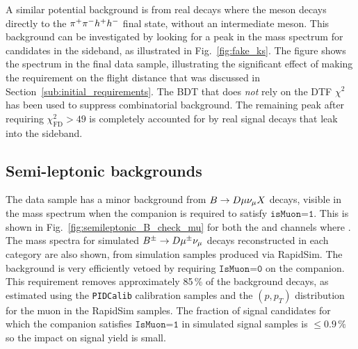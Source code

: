 A similar potential background is from real \BtoDh decays where the \D meson decays directly to the ${{\pi}^+}{{\pi}^-} h^+ h^-$ final state, without an intermediate \KS meson. This background can be investigated by looking for a peak in the \B mass spectrum for candidates in the \KS sideband, as illustrated in Fig.~\ref{fig:fake_ks}. The figure shows the spectrum in the final data sample, illustrating the significant effect of making the requirement on the \KS flight distance that was discussed in Section~\ref{sub:initial_requirements}. The BDT that does \emph{not} rely on the DTF $\chi^2$ has been used to suppress combinatorial background. The remaining peak after requiring $\chi^2_\text{FD}>49$ is completely accounted for by real signal decays that leak into the \KS sideband.


\subsection{Semi-leptonic backgrounds} %
\label{sub:semi_leptonic_backgrounds}



The data sample has a minor background from ${B}\rightarrow{\ensuremath{D}}\mu\nu_\mu X$ decays, visible in the \B mass spectrum when the companion is required to satisfy $\texttt{isMuon=1}$.  This is shown in Fig.~\ref{fig:semileptonic_B_check_mu} for both the \BtoDK and \BtoDpi channels where \DtoKspipi. The \B mass spectra for simulated ${{B}^\pm}\rightarrow{\ensuremath{D}}{\ensuremath{\mu^\pm}}\nu_\mu$ decays reconstructed in each category are also shown, from simulation samples produced via RapidSim. The background is very efficiently vetoed by requiring $\texttt{IsMuon=0}$ on the companion. This requirement removes approximately 85\,\% of the background decays, as estimated using the \texttt{PIDCalib} calibration samples and the $(p, p_T)$ distribution for the muon in the RapidSim samples. The fraction of signal candidates for which the companion satisfies $\texttt{IsMuon=1}$ in simulated signal samples is $\leq 0.9\,\%$ so the impact on signal yield is small.

